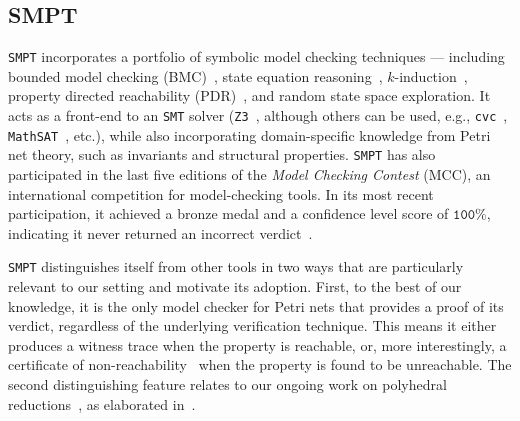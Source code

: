 	
\subsection{SMPT}


\texttt{SMPT} incorporates a portfolio of symbolic model checking techniques --- including bounded model checking (BMC)~\cite{BiCiClZh99}, state equation reasoning~\cite{Mu77}, $k$-induction~\cite{BeDaWe18,ShSiSt20}, property directed reachability (PDR)~\cite{Br11,AmDaHu22,ViGu14,BjGa15}, and random state space exploration. It acts as a front-end to an \texttt{SMT} solver (\texttt{Z3}~\cite{DeBj08}, although others can be used, e.g., \texttt{cvc}~\cite{BaCoDeHaJoKiReTi11,BaBaBrKrLaMaMoMoNiNo22}, \texttt{MathSAT}~\cite{CiGrScSe13}, etc.), while also incorporating domain-specific knowledge from Petri net theory, such as invariants and structural properties. \texttt{SMPT} has also participated in the last five editions of the \textit{Model Checking Contest} (MCC), an international competition for model-checking tools. In its most recent participation, it achieved a bronze medal and a confidence level score of  $\texttt{100\%}$, indicating it never returned an incorrect verdict~\cite{mcc:2025}.

\medskip
\texttt{SMPT} distinguishes itself from other tools in two ways that are particularly relevant to our setting and motivate its adoption. First, to the best of our knowledge, it is the only model checker for Petri nets that provides a proof of its verdict, regardless of the underlying verification technique. This means it either produces a witness trace when the property is reachable, or, more interestingly, a certificate of non-reachability~\cite{AmDaHu22} when the property is found to be unreachable.
%
The second distinguishing feature relates to our ongoing work on polyhedral reductions~\cite{AmBeDa21}, as elaborated in~.



